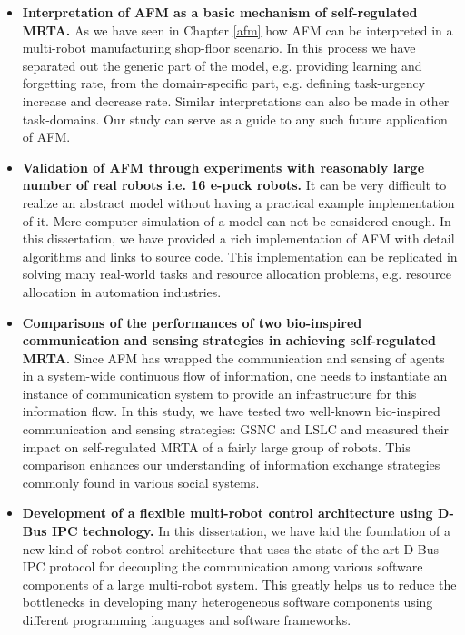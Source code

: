 \begin{itemize}
\item \textbf{Interpretation of AFM as a basic mechanism of self-regulated MRTA.} As we have seen in Chapter \ref{afm} how AFM can be  interpreted in a multi-robot manufacturing shop-floor scenario.  In this process we have separated out the generic part of the model, e.g. providing learning and forgetting rate, from the domain-specific part, e.g. defining task-urgency increase and decrease rate. Similar interpretations can also be made in other task-domains. Our study can serve as a guide to any such future application of AFM.
%
\item \textbf{Validation of AFM through experiments with reasonably large number of real robots i.e. 16 e-puck robots.} It can be very difficult to realize an abstract model without having a practical example implementation of it. Mere computer simulation of a model can not be considered enough. In this dissertation, we have provided a rich implementation of AFM with detail algorithms and links to source code. This implementation can be replicated in solving many real-world tasks and resource allocation problems, e.g. resource allocation in automation industries.
%
\item \textbf{Comparisons of the performances of two bio-inspired communication and sensing strategies in achieving self-regulated MRTA.} Since AFM has wrapped the communication and sensing of agents  in a system-wide continuous flow of information, one needs to instantiate an instance of communication system to provide an infrastructure for this information flow. In this study, we have tested two well-known bio-inspired  communication and sensing strategies: GSNC and LSLC and measured their impact on self-regulated MRTA of a fairly large group of robots. This comparison enhances our understanding of information exchange strategies commonly found in various social systems.
%
\item \textbf{Development of a flexible multi-robot control architecture using D-Bus IPC technology.} In this dissertation, we have laid the foundation of a new kind of robot control architecture that uses the state-of-the-art D-Bus IPC protocol for decoupling the communication among various software components of a large multi-robot system. This greatly helps us to reduce the bottlenecks in developing many heterogeneous software components using different programming languages and software frameworks.
%

\end{itemize}
